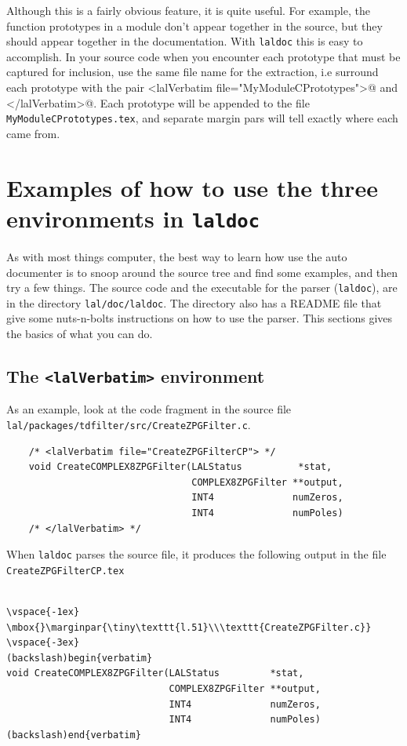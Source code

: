 \documentclass[oneside]{book}
\begin{document}
Although this is a fairly obvious feature, it is quite useful.  For
example, the function prototypes in a module don't appear together in
the source, but they should appear together in the documentation.
With {\texttt {laldoc}} this is easy to accomplish. In your source
code when you encounter each prototype that must be captured for
inclusion, use the same file name for the extraction, i.e surround
each prototype with
the pair {\verb@<lalVerbatim file="MyModuleCPrototypes">@}  and
{\verb@</lalVerbatim>@}.  Each prototype will be appended to the file
{\tt MyModuleCPrototypes.tex}, and separate margin pars will tell 
exactly where each came from.





\section{Examples of how to use the three environments in {\texttt {laldoc}} }

As with most things computer, the best way to learn how use the auto
documenter is to snoop around the source tree and find some examples,
and then try a few things.  The source code and the executable for the
parser ({\tt laldoc}), are in the directory {\tt lal/doc/laldoc}.  The
directory also has a README file that give some nuts-n-bolts
instructions on how to use the parser.  This sections gives the basics
of what you can do.


\subsection{The {\texttt {<lalVerbatim>} }  environment }

As an example, look at the code fragment in the source file 
\texttt{lal/packages/tdfilter/src/CreateZPGFilter.c}.

\begin{verbatim}
    /* <lalVerbatim file="CreateZPGFilterCP"> */
    void CreateCOMPLEX8ZPGFilter(LALStatus          *stat,
                                 COMPLEX8ZPGFilter **output,
                                 INT4              numZeros,
                                 INT4              numPoles)
    /* </lalVerbatim> */
\end{verbatim}
When {\tt laldoc} parses the source file, it produces the following
output in the file {\tt CreateZPGFilterCP.tex}

\begin{verbatim}

\vspace{-1ex}
\mbox{}\marginpar{\tiny\texttt{l.51}\\\texttt{CreateZPGFilter.c}}
\vspace{-3ex}
(backslash)begin{verbatim}
void CreateCOMPLEX8ZPGFilter(LALStatus         *stat,
                             COMPLEX8ZPGFilter **output,
                             INT4              numZeros,
                             INT4              numPoles)
(backslash)end{verbatim}
\end{verbatim}
\end{document}
